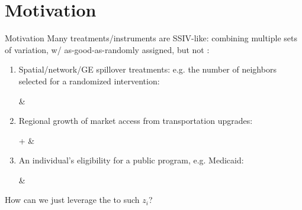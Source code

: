 \documentclass{beamer}
\begin{document}

\section{Motivation}

\begin{frame}{Motivation} 
Many treatments/instruments are SSIV-like: combining multiple sets of variation, w/  as-good-as-randomly assigned, but not :

\pause
\begin{enumerate}
  \item Spatial/network/GE spillover treatments: e.g. the number of neighbors selected for a randomized intervention:\pause

   \&  

  \smallskip\pause
  \item Regional growth of market access from transportation upgrades:\pause

   +  \& 

  \smallskip\pause
  \item An individual's eligibility for a public program, e.g. Medicaid:\pause

   \& 
\end{enumerate}

\bigskip\pause
How can we just leverage the  to such $z_i$?
\end{frame}
\end{document}
